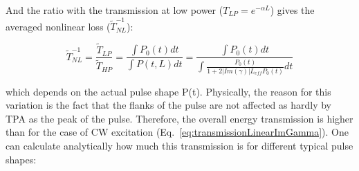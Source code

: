 And the ratio with the transmission at low power ($T_{LP} = e^{-\alpha L} $) gives the averaged nonlinear loss ($\tilde{T}^{-1}_{NL}$):

\begin{equation}
 \tilde{T}^{-1}_{NL}  = \frac{\tilde{T}_{LP}}{\tilde{T}_{HP}} = \frac{\int P_0(t)dt}{\int P(t,L)dt} = \frac{\int P_0(t)dt}{\int \frac{P_0(t)}{1+2|Im(\gamma)| L_{eff} P_0(t)} dt}
\label{eq:transmissionIntegralImGamma}
\end{equation}

which depends on the actual pulse shape P(t).
Physically, the reason for this variation is the fact that the flanks of the pulse are not affected as hardly by TPA as the peak of the pulse.
Therefore, the overall energy transmission is higher than for the case of CW excitation (Eq.~\ref{eq:transmissionLinearImGamma}).
One can calculate analytically how much this transmission is for different typical pulse shapes:

